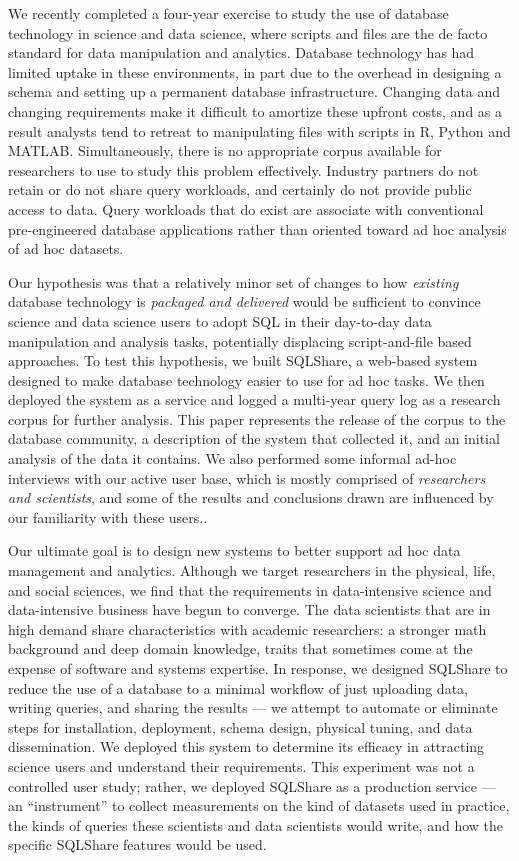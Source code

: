 \documentclass{sig-alternate}
\newcommand{\note}[2]{{\color{#1} {#2}}}
\newcommand{\reviewmeta}[1]{\note{black}{#1}}
\newcommand{\sqlshare}{SQLShare}
\begin{document}
We recently completed a four-year exercise to study the use of database technology in science and data science, where scripts and files are the de facto standard for data manipulation and analytics. 
Database technology has had limited uptake in these environments, in part due to the overhead in designing a schema and setting up a permanent database infrastructure.  Changing data and changing requirements make it difficult to amortize these upfront costs, and as a result analysts tend to retreat to manipulating files with scripts in R, Python and MATLAB.
Simultaneously, there is no appropriate corpus available for researchers to use to study this problem effectively.  Industry partners do not retain or do not share query workloads, and certainly do not provide public access to data. Query workloads that do exist are associate with conventional pre-engineered database applications rather than oriented toward ad hoc analysis of ad hoc datasets.

Our hypothesis was that a relatively minor set of changes to how \emph{existing} database technology is \emph{packaged and delivered} would be sufficient to convince science and data science users to adopt SQL in their day-to-day data manipulation and analysis tasks, \reviewmeta{potentially} displacing script-and-file based approaches.  To test this hypothesis, we built 
\sqlshare{}, a web-based system designed to make database technology easier to use for ad hoc tasks.  We then deployed the system as a service and logged a multi-year query log as a research corpus for further analysis.  This paper represents the release of the corpus to the database community, a description of the system that collected it, and an initial analysis of the data it contains. \reviewmeta{We also performed some informal ad-hoc interviews with our active user base, which is mostly comprised of \emph{researchers and scientists}, and some of the results and conclusions drawn are influenced by our familiarity with these users.}. 

Our ultimate goal is to design new systems to better support ad hoc data management and analytics.
Although we target researchers in the physical, life, and social sciences, we find that the requirements in data-intensive science and data-intensive business have begun to converge. The data scientists that are in high demand
share characteristics with academic researchers: a stronger math background and deep domain knowledge, 
traits that sometimes come at the expense of software and systems expertise.
In response, we designed \sqlshare{} \cite{howe2013sqlshare,howe2011database} to reduce the use of a database to a minimal workflow of just uploading data, writing queries, and sharing the results --- we attempt to automate or eliminate steps for installation, deployment, schema design, physical tuning, and data dissemination.  
We deployed this system to determine its efficacy in attracting science users and understand their requirements.  This experiment was not a controlled user study; rather, we deployed \sqlshare{} as a production service --- an ``instrument'' to collect measurements on the kind of datasets used in practice, the kinds of queries these scientists and data scientists would write, and how the specific \sqlshare{} features would be used.
\end{document}
